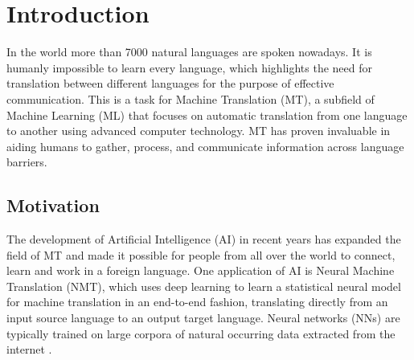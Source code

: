 \chapter{Introduction}
\label{ch:Introduction}





In the world more than 7000 natural languages are spoken nowadays. It is humanly impossible to learn every language, which highlights the need for translation between different languages for the purpose of effective communication. This is a task for Machine Translation (MT), a subfield of Machine Learning (ML) that focuses on automatic translation from one language to another using advanced computer technology. MT has proven invaluable in aiding humans to gather, process, and communicate information across language barriers.

\section{Motivation}
\label{sec:Introduction:Motivation}

The development of Artificial Intelligence (AI) in recent years has expanded the field of MT and made it possible for people from all over the world to connect, learn and work in a foreign language. One application of AI is Neural Machine Translation (NMT), which uses deep learning to learn a statistical neural model for machine translation in an end-to-end fashion, translating directly from an input source language to an output target language. Neural networks (NNs) are typically trained on large corpora of natural occurring data extracted from the internet \parencite{NMT}. 

